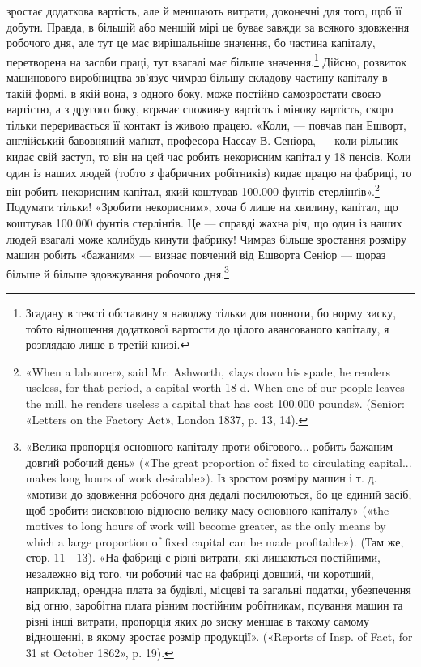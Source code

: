 зростає додаткова вартість, але й меншають витрати, доконечні
для того, щоб її добути. Правда, в більшій або меншій мірі це
буває завжди за всякого здовження робочого дня, але тут це
має вирішальніше значення, бо частина капіталу, перетворена
на засоби праці, тут взагалі має більше значення.\footnote{
Згадану в тексті обставину я наводжу тільки для повноти, бо
норму зиску, тобто відношення додаткової вартости до цілого авансованого
капіталу, я розглядаю лише в третій книзі.
} Дійсно,
розвиток машинового виробництва зв’язує чимраз більшу складову
частину капіталу в такій формі, в якій вона, з одного боку, може
постійно самозростати своєю вартістю, а з другого боку, втрачає
споживну вартість і мінову вартість, скоро тільки переривається
її контакт із живою працею. «Коли, — повчав пан Ешворт,
англійський бавовняний маґнат, професора Нассау В. Сеніора, —
коли рільник кидає свій заступ, то він на цей час робить некорисним
капітал у 18 пенсів. Коли один із наших людей (тобто
з фабричних робітників) кидає працю на фабриці, то він робить
некорисним капітал, який коштував 100.000 фунтів стерлінґів».\footnote{
«When a labourer», said Mr. Ashworth, «lays down his spade, he
renders useless, for that period, a capital worth 18 d. When one of our people
leaves the mill, he renders useless a capital that has cost 100.000 pounds».
(Senior: «Letters on the Factory Act», London 1837, p. 13, 14).
}
Подумати тільки! «Зробити некорисним», хоча б лише на хвилину,
капітал, що коштував 100.000 фунтів стерлінґів. Це — справді
жахна річ, що один із наших людей взагалі може колибудь кинути
фабрику! Чимраз більше зростання розміру машин робить «бажаним»
— визнає повчений від Ешворта Сеніор — щораз більше
й більше здовжування робочого дня.\footnote{
«Велика пропорція основного капіталу проти обігового... робить
бажаним довгий робочий день» («The great proportion of fixed to circulating
capital... makes long hours of work desirable»). Із зростом розміру
машин і т. д. «мотиви до здовження робочого дня дедалі посилюються,
бо це єдиний засіб, щоб зробити зисковною відносно велику масу основного
капіталу» («the motives to long hours of work will become greater,
as the only means by which a large proportion of fixed capital can be
made profitable»). (Там же, стор. 11—13). «На фабриці є різні витрати,
які лишаються постійними, незалежно від того, чи робочий час на
фабриці довший, чи коротший, наприклад, орендна плата за будівлі, місцеві
та загальні податки, убезпечення від огню, заробітна плата різним
постійним робітникам, псування машин та різні інші витрати, пропорція
яких до зиску меншає в такому самому відношенні, в якому
зростає розмір продукції». («Reports of Insp. of Fact, for 31 st October
1862», p. 19).
}


